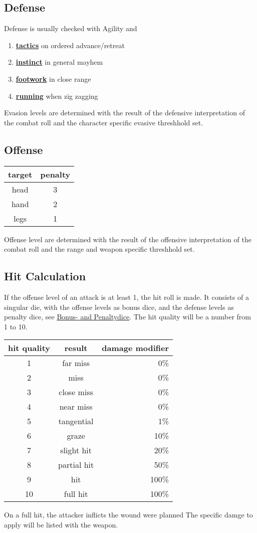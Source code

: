 \subsection{Defense}\label{subsec:defense}
Defense is usually checked with Agility and
\begin{enumerate}[label = - ]
    \item \hyperref[subsec:tactics]{\textbf{tactics}} on ordered advance/retreat
    \item \hyperref[subsec:instinct]{\textbf{instinct}} in general mayhem
    \item \hyperref[subsec:footwork]{\textbf{footwork}} in close range
    \item \hyperref[subsec:running]{\textbf{running}} when zig zagging
\end{enumerate}
Evasion levels are determined with the result of the defensive interpretation of the combat roll
and the character specific evasive threshhold set.

\subsection{Offense}\label{subsec:offense}
\begin{tabular}{cc}
    target & penalty\\\hline
    head & 3 \\
    hand & 2 \\
    legs & 1 \\
\end{tabular}
Offense level are determined with the result of the offensive interpretation of the combat roll and the range and
weapon specific threshhold set.

\subsection{Hit Calculation}\label{subsec:hit}
If the offense level of an attack is at least 1, the hit roll is made.
It consists of a singular die, with the offense levels as bonus dice, and the defense levels as penalty dice,
see \hyperref[sec:bonus--and-penaltydice]{Bonus- and Penaltydice}.
The hit quality will be a number from 1 to 10.
\begin{tabular}{c|cr}
    hit quality & result & damage modifier \\\hline
    1 & far miss & 0\%\\
    2 & miss& 0\%\\
    3 & close miss& 0\%\\
    4 & near miss& 0\%\\
    5 & tangential& 1\%\\
    6 & graze& 10\%\\
    7 & slight hit& 20\%\\
    8 & partial hit& 50\%\\
    9 & hit& 100\%\\
    10 & full hit& 100\%\\
\end{tabular}

On a full hit, the attacker inflicts the wound were planned
The specific damge to apply will be listed with the weapon.

